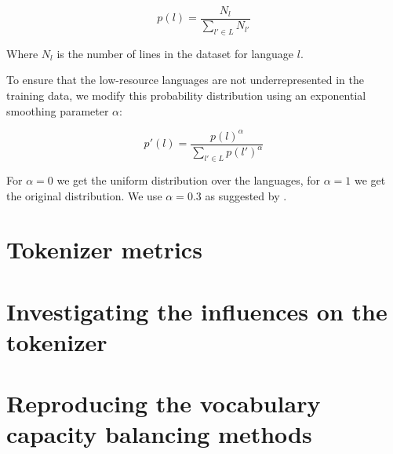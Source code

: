 \begin{equation}
    p(l) = \frac{N_l}{\sum_{l' \in L} N_{l'}}
\end{equation}

Where $N_l$ is the number of lines in the dataset for language $l$.

To ensure that the low-resource languages are not underrepresented in the training data, we modify this probability distribution using an exponential smoothing parameter $\alpha$:

\begin{equation}
    p'(l) = \frac{p(l)^\alpha}{\sum_{l' \in L} p(l')^\alpha}
\end{equation}

For $\alpha = 0$ we get the uniform distribution over the languages, for $\alpha = 1$ we get the original distribution. We use $\alpha = 0.3$ as suggested by \citet{conneau_unsupervised_2020-1}.

\section{Tokenizer metrics}

\section{Investigating the influences on the tokenizer}

\section{Reproducing the vocabulary capacity balancing methods}



